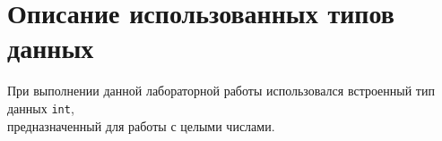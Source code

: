 \section{Описание использованных типов данных}

При выполнении данной лабораторной работы использовался
встроенный тип данных \texttt{int}, \\
предназначенный для работы с целыми числами.
